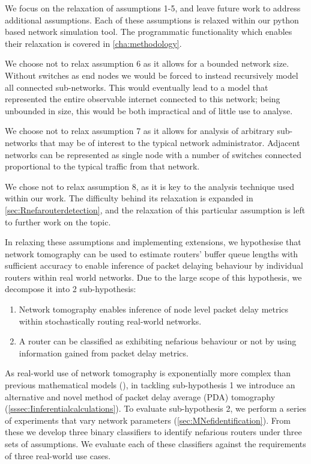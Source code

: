 We focus on the relaxation of assumptions 1-5, and leave future work to address additional assumptions. Each of these assumptions is relaxed within our python based network simulation tool. The programmatic functionality which enables their relaxation is covered in \cref{cha:methodology}.\par
We choose not to relax assumption 6 as it allows for a bounded network size. Without switches as end nodes we would be forced to instead recursively model all connected sub-networks. This would eventually lead to a model that represented the entire observable internet connected to this network; being unbounded in size, this would be both impractical and of little use to analyse.\par
We choose not to relax assumption 7 as it allows for analysis of arbitrary sub-networks that may be of interest to the typical network administrator. Adjacent networks can be represented as single node with a number of switches connected proportional to the typical traffic from that network.\par
We chose not to relax assumption 8, as it is key to the analysis technique used within our work. The difficulty behind its relaxation is expanded in \cref{sec:Rnefarouterdetection}, and the relaxation of this particular assumption is left to further work on the topic.\par
In relaxing these assumptions and implementing extensions, we hypothesise that network tomography can be used to estimate routers' buffer queue lengths with sufficient accuracy to enable inference of packet delaying behaviour by individual routers within real world networks. Due to the large scope of this hypothesis, we decompose it into 2 sub-hypothesis:
\begin{enumerate}
    \item Network tomography enables inference of node level packet delay metrics within stochastically routing real-world networks.
    \item A router can be classified as exhibiting nefarious behaviour or not by using information gained from packet delay metrics.
\end{enumerate}
As real-world use of network tomography is exponentially more complex than previous mathematical models (\cite{barnes_stochastic_2020}), in tackling sub-hypothesis 1 we introduce an alternative and novel method of packet delay average (PDA) tomography (\cref{sssec:Iinferentialcalculations}). To evaluate sub-hypothesis 2, we perform a series of experiments that vary network parameters (\cref{sec:MNefidentification}). From these we develop three binary classifiers to identify nefarious routers under three sets of assumptions. We evaluate each of these classifiers against the requirements of three real-world use cases.\par
